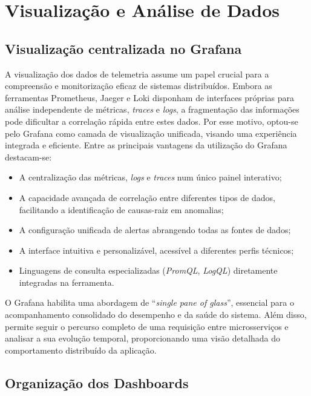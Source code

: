 \chapter{Visualização e Análise de Dados}

\section{Visualização centralizada no Grafana}

A visualização dos dados de telemetria assume um papel crucial para a compreensão e monitorização eficaz de sistemas distribuídos. Embora as ferramentas Prometheus, Jaeger e Loki disponham de interfaces próprias para análise independente de métricas, \textit{traces} e \textit{logs}, a fragmentação das informações pode dificultar a correlação rápida entre estes dados. Por esse motivo, optou-se pelo Grafana como camada de visualização unificada, visando uma experiência integrada e eficiente. Entre as principais vantagens da utilização do Grafana destacam-se:

\begin{itemize}
\item A centralização das métricas, \textit{logs} e \textit{traces} num único painel interativo;
\item A capacidade avançada de correlação entre diferentes tipos de dados, facilitando a identificação de causas-raiz em anomalias;
\item A configuração unificada de alertas abrangendo todas as fontes de dados;
\item A interface intuitiva e personalizável, acessível a diferentes perfis técnicos;
\item Linguagens de consulta especializadas (\textit{PromQL}, \textit{LogQL}) diretamente integradas na ferramenta.
\end{itemize}

O Grafana habilita uma abordagem de ``\textit{single pane of glass}'', essencial para o acompanhamento consolidado do desempenho e da saúde do sistema. Além disso, permite seguir o percurso completo de uma requisição entre microsserviços e analisar a sua evolução temporal, proporcionando uma visão detalhada do comportamento distribuído da aplicação.



\break

\section{Organização dos Dashboards}

